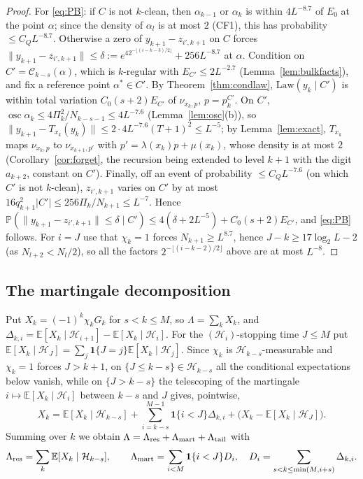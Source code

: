 \documentclass[11pt]{amsart}
\theoremstyle{definition}
\numberwithin{equation}{section}
\newcommand{\E}{\mathbb{E}}
\newcommand{\Prob}{\mathbb{P}}
\newcommand{\cH}{\mathcal{H}}
\newcommand{\cC}{\mathcal{C}}
\newcommand{\ind}{\mathbf{1}}
\DeclareMathOperator{\osc}{osc}
\begin{document}
\begin{proof}
For \eqref{eq:PB}: if $C$ is not $k$-clean, then $\alpha_{k-1}$ or $\alpha_k$ is within $4L^{-8.7}$ of $E_0$ at the point $\alpha$; since the density of
$\alpha_l$ is at most $2$ (CF1), this has probability $\le C_QL^{-8.7}$. Otherwise a zero of $y_{k+1}-z_{i',k+1}$ on $C$ forces
$\|y_{k+1}-z_{i',k+1}\|\le\delta:=e^42^{-\lfloor(i-k-3)/2\rfloor}+256L^{-8.7}$ at $\alpha$. Condition on $C'=\cC_{k-s}(\alpha)$, which is $k$-regular with
$E_{C'}\le2L^{-2.7}$ (Lemma~\ref{lem:bulkfacts}), and fix a reference point $\alpha^*\in C'$. By Theorem~\ref{thm:condlaw}, $\mathrm{Law}(y_k\mid C')$ is within total
variation $C_0(s+2)E_{C'}$ of $\nu_{x_k,p}$, $p=p^{C'}_k$. On $C'$, $\osc\alpha_k\le4\Pi_k^2/N_{k-s-1}\le4L^{-7.6}$ (Lemma~\ref{lem:osc}(b)), so
$\|y_{k+1}-T_{x_k}(y_k)\|\le2\cdot4L^{-7.6}(T+1)^2\le L^{-5}$; by Lemma~\ref{lem:exact}, $T_{x_k}$ maps $\nu_{x_k,p}$ to $\nu_{x_{k+1},p'}$ with $p'=\lambda(x_k)p+\mu(x_k)$,
whose density is at most $2$ (Corollary~\ref{cor:forget}, the recursion being extended to level $k+1$ with the digit $a_{k+2}$, constant on $C'$). Finally,
off an event of probability $\le C_QL^{-7.6}$ (on which $C'$ is not $k$-clean), $z_{i',k+1}$ varies on $C'$ by at most
$16q_{k+1}^2|C'|\le256\Pi_k/N_{k+1}\le L^{-7}$. Hence $\Prob(\|y_{k+1}-z_{i',k+1}\|\le\delta\mid C')\le4(\delta+2L^{-5})+C_0(s+2)E_{C'}$, and \eqref{eq:PB}
follows. For $i=J$ use that $\chi_k=1$ forces $N_{k+1}\ge L^{8.7}$, hence $J-k\ge17\log_2L-2$ (as $N_{l+2}<N_l/2$), so all the factors
$2^{-\lfloor(i-k-2)/2\rfloor}$ above are at most $L^{-8}$.
\end{proof}

\subsection{The martingale decomposition}
Put $X_k=(-1)^k\chi_kG_k$ for $s<k\le M$, so $\Lambda=\sum_kX_k$, and $\Delta_{k,i}=\E[X_k\mid\cH_{i+1}]-\E[X_k\mid\cH_i]$. For the
$(\cH_i)$-stopping time $J\le M$ put $\E[X_k\mid\cH_J]=\sum_j\ind\{J=j\}\E[X_k\mid\cH_j]$. Since $\chi_k$ is $\cH_{k-s}$-measurable and
$\chi_k=1$ forces $J>k+1$, on $\{J\le k-s\}\in\cH_{k-s}$ all the conditional expectations below vanish, while on $\{J>k-s\}$ the
telescoping of the martingale $i\mapsto\E[X_k\mid\cH_i]$ between $k-s$ and $J$ gives, pointwise,
\[
X_k=\E[X_k\mid\cH_{k-s}]+\sum_{i=k-s}^{M-1}\ind\{i<J\}\Delta_{k,i}+\big(X_k-\E[X_k\mid\cH_J]\big).
\]
Summing over $k$ we obtain $\Lambda=\Lambda_{\rm res}+\Lambda_{\rm mart}+\Lambda_{\rm tail}$ with
\[
\Lambda_{\rm res}=\sum_k\E[X_k\mid\cH_{k-s}],\qquad \Lambda_{\rm mart}=\sum_{i<M}\ind\{i<J\}D_i,\quad D_i=\sum_{s<k\le\min(M,i+s)}\Delta_{k,i}.
\]
\end{document}
